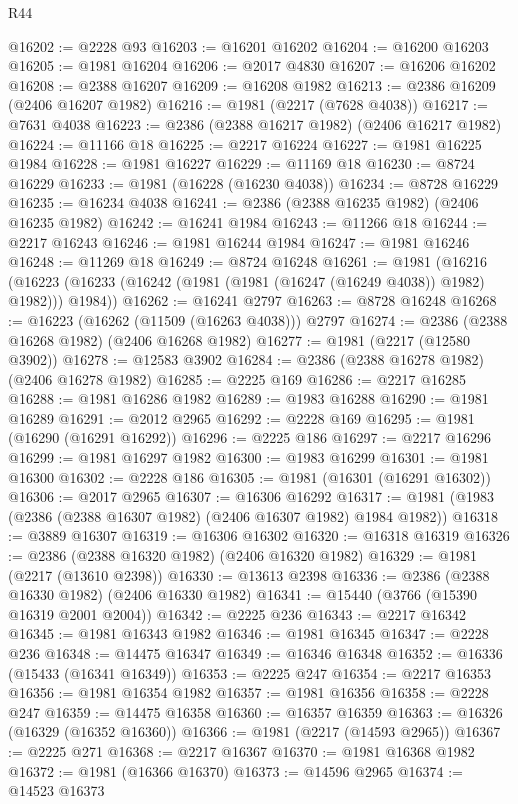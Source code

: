 \begin{lexlean}{R44}
\begin{coremodule}
@16202 := @2228 @93
@16203 := @16201 @16202
@16204 := @16200 @16203
@16205 := @1981 @16204
@16206 := @2017 @4830
@16207 := @16206 @16202
@16208 := @2388 @16207
@16209 := @16208 @1982
@16213 := @2386 @16209 (@2406 @16207 @1982)
@16216 := @1981 (@2217 (@7628 @4038))
@16217 := @7631 @4038
@16223 := @2386 (@2388 @16217 @1982) (@2406 @16217 @1982)
@16224 := @11166 @18
@16225 := @2217 @16224
@16227 := @1981 @16225 @1984
@16228 := @1981 @16227
@16229 := @11169 @18
@16230 := @8724 @16229
@16233 := @1981 (@16228 (@16230 @4038))
@16234 := @8728 @16229
@16235 := @16234 @4038
@16241 := @2386 (@2388 @16235 @1982) (@2406 @16235 @1982)
@16242 := @16241 @1984
@16243 := @11266 @18
@16244 := @2217 @16243
@16246 := @1981 @16244 @1984
@16247 := @1981 @16246
@16248 := @11269 @18
@16249 := @8724 @16248
@16261 := @1981
    (@16216 (@16223 (@16233 (@16242 (@1981 (@1981 (@16247 (@16249 @4038)) @1982) @1982))) @1984))
@16262 := @16241 @2797
@16263 := @8728 @16248
@16268 := @16223 (@16262 (@11509 (@16263 @4038))) @2797
@16274 := @2386 (@2388 @16268 @1982) (@2406 @16268 @1982)
@16277 := @1981 (@2217 (@12580 @3902))
@16278 := @12583 @3902
@16284 := @2386 (@2388 @16278 @1982) (@2406 @16278 @1982)
@16285 := @2225 @169
@16286 := @2217 @16285
@16288 := @1981 @16286 @1982
@16289 := @1983 @16288
@16290 := @1981 @16289
@16291 := @2012 @2965
@16292 := @2228 @169
@16295 := @1981 (@16290 (@16291 @16292))
@16296 := @2225 @186
@16297 := @2217 @16296
@16299 := @1981 @16297 @1982
@16300 := @1983 @16299
@16301 := @1981 @16300
@16302 := @2228 @186
@16305 := @1981 (@16301 (@16291 @16302))
@16306 := @2017 @2965
@16307 := @16306 @16292
@16317 := @1981 (@1983 (@2386 (@2388 @16307 @1982) (@2406 @16307 @1982) @1984 @1982))
@16318 := @3889 @16307
@16319 := @16306 @16302
@16320 := @16318 @16319
@16326 := @2386 (@2388 @16320 @1982) (@2406 @16320 @1982)
@16329 := @1981 (@2217 (@13610 @2398))
@16330 := @13613 @2398
@16336 := @2386 (@2388 @16330 @1982) (@2406 @16330 @1982)
@16341 := @15440 (@3766 (@15390 @16319 @2001 @2004))
@16342 := @2225 @236
@16343 := @2217 @16342
@16345 := @1981 @16343 @1982
@16346 := @1981 @16345
@16347 := @2228 @236
@16348 := @14475 @16347
@16349 := @16346 @16348
@16352 := @16336 (@15433 (@16341 @16349))
@16353 := @2225 @247
@16354 := @2217 @16353
@16356 := @1981 @16354 @1982
@16357 := @1981 @16356
@16358 := @2228 @247
@16359 := @14475 @16358
@16360 := @16357 @16359
@16363 := @16326 (@16329 (@16352 @16360))
@16366 := @1981 (@2217 (@14593 @2965))
@16367 := @2225 @271
@16368 := @2217 @16367
@16370 := @1981 @16368 @1982
@16372 := @1981 (@16366 @16370)
@16373 := @14596 @2965
@16374 := @14523 @16373

\end{coremodule}
\end{lexlean}
